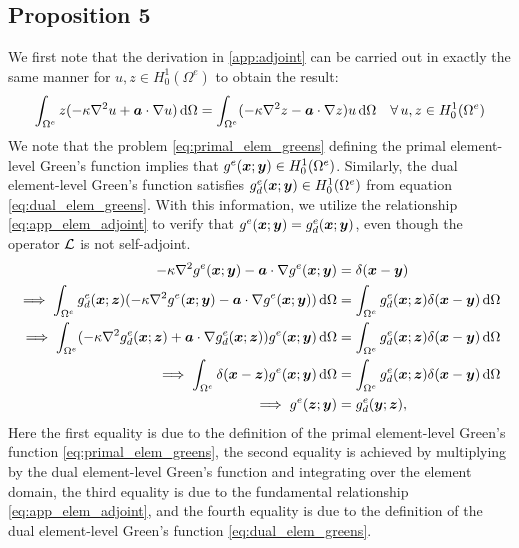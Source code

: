 \subsection{Proposition 5}

We first note that
the derivation in \ref{app:adjoint} can
be carried out in exactly the same manner
for $u,z \in H^1_0(\Omega^e)$ to obtain the result:
%
\begin{gather}
\int_{\Omega^e} z(-\kappa \nabla^2 {u} + \boldsymbol{a} \cdot \nabla {u}) \, \text{d} \Omega =
\int_{\Omega^e} (-\kappa \nabla^2 {z} - \boldsymbol{a} \cdot \nabla {z}) u \, \text{d} \Omega
\quad \forall \, u,z \in H^1_0(\Omega^e)
\label{eq:app_elem_adjoint}
\end{gather}
%
We note that the problem \eqref{eq:primal_elem_greens}
defining the primal element-level Green's function implies that
$g^e(\boldsymbol{x}; \boldsymbol{y}) \in H^1_0(\Omega^e)$.
Similarly, the dual element-level Green's function satisfies
$g^e_d(\boldsymbol{x}; \boldsymbol{y}) \in H^1_0(\Omega^e)$ from equation
\eqref{eq:dual_elem_greens}. With this information,
we utilize the relationship \eqref{eq:app_elem_adjoint} to verify
that $g^e(\boldsymbol{x}; \boldsymbol{y}) = g^e_d(\boldsymbol{x}; \boldsymbol{y})$, even though
the operator $\mathcal{L}$ is not self-adjoint.
%
\begin{gather*}
\begin{aligned}
-\kappa \nabla^2 { g^e(\boldsymbol{x}; \boldsymbol{y}) } - \boldsymbol{a} \cdot \nabla { g^e(\boldsymbol{x}; \boldsymbol{y}) }
&=
\delta(\boldsymbol{x} - \boldsymbol{y}) \\
\implies \int_{\Omega^e}
g^e_d(\boldsymbol{x}; \boldsymbol{z}) (-\kappa \nabla^2 { g^e(\boldsymbol{x}; \boldsymbol{y}) } - \boldsymbol{a} \cdot \nabla { g^e(\boldsymbol{x}; \boldsymbol{y}) })
\, \text{d} \Omega
&=
\int_{\Omega^e}
g^e_d(\boldsymbol{x}; \boldsymbol{z}) \delta(\boldsymbol{x} - \boldsymbol{y})
\, \text{d} \Omega \\
\implies
\int_{\Omega^e} (-\kappa \nabla^2 { g^e_d(\boldsymbol{x}; \boldsymbol{z})} + \boldsymbol{a} \cdot \nabla { g^e_d(\boldsymbol{x}; \boldsymbol{z})}) g^e(\boldsymbol{x}; \boldsymbol{y})
\, \text{d} \Omega
&=
\int_{\Omega^e}
g^e_d(\boldsymbol{x}; \boldsymbol{z}) \delta(\boldsymbol{x} - \boldsymbol{y})
\, \text{d} \Omega \\
\implies
\int_{\Omega^e} \delta(\boldsymbol{x} - \boldsymbol{z}) g^e(\boldsymbol{x}; \boldsymbol{y})
\, \text{d} \Omega
&=
\int_{\Omega^e}
g^e_d(\boldsymbol{x}; \boldsymbol{z}) \delta(\boldsymbol{x} - \boldsymbol{y})
\, \text{d} \Omega \\
\implies
g^e(\boldsymbol{z}; \boldsymbol{y})
&=
g^e_d(\boldsymbol{y}; \boldsymbol{z}),
\end{aligned}
\end{gather*}
%
Here the first equality is due to the definition of the
primal element-level Green's function \eqref{eq:primal_elem_greens},
the second equality is achieved by multiplying by the dual
element-level Green's function and integrating over the element domain,
the third equality is due to the fundamental relationship
\eqref{eq:app_elem_adjoint}, and the fourth equality is due to the
definition of the dual element-level Green's function
\eqref{eq:dual_elem_greens}.

